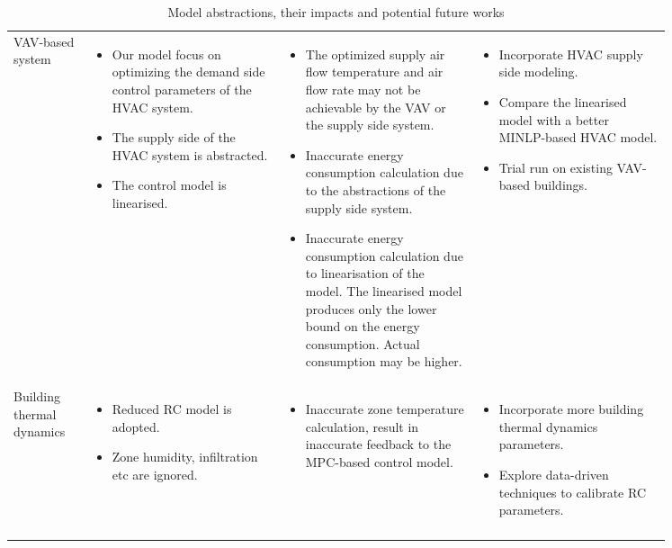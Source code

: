 \begin{table*}[h]
\centering
\begin{tabular}{p{0.1\linewidth} p{0.25\linewidth} p{0.25\linewidth}  p{0.25\linewidth}}
\hline \centering{\textbf{Model}} & \centering{\textbf{Abstractions}} & \centering{\textbf{Impacts}} & \centering{\textbf{Future Work}} \tabularnewline
\hline VAV-based system & 
\begin{itemize}
	\item Our model focus on optimizing the demand side control parameters of the HVAC system.
	\item The supply side of the HVAC system is abstracted.
	\item The control model is linearised.
\end{itemize} & 
\begin{itemize}		
	\item The optimized supply air flow temperature and air flow rate may not be achievable by the VAV or the supply side system.
	\item Inaccurate energy consumption calculation due to the abstractions of the supply side system.
	\item Inaccurate energy consumption calculation due to linearisation of the model. The linearised model produces only the lower bound on the energy consumption. Actual consumption may be higher.
\end{itemize} & 
\begin{itemize}	
	\item Incorporate HVAC supply side modeling.
	\item Compare the linearised model with a better MINLP-based HVAC model.
	\item Trial run on existing VAV-based buildings.
\end{itemize}
\tabularnewline
\hline Building thermal dynamics &
\begin{itemize}
	\item Reduced RC model is adopted.
	\item Zone humidity, infiltration etc are ignored.
\end{itemize}& 
\begin{itemize}
	\item Inaccurate zone temperature calculation, result in inaccurate feedback to the MPC-based control model.
\end{itemize}&
\begin{itemize}
	\item Incorporate more building thermal dynamics parameters.
	\item Explore data-driven techniques to calibrate RC parameters.	
\end{itemize}
 \tabularnewline
\tabularnewline
\end{tabular}
	\caption{Model abstractions, their impacts and potential future works}
	\label{tab:impact}
\end{table*}

